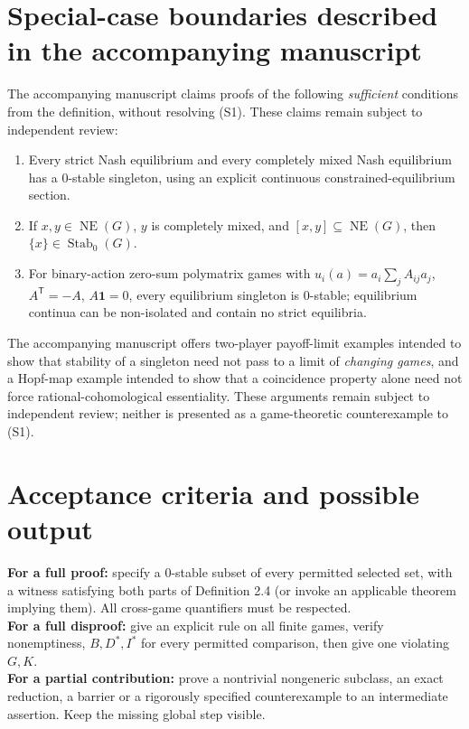 \documentclass[11pt]{article}
\newcommand{\NE}{\operatorname{NE}}
\newcommand{\Stab}{\operatorname{Stab}_0}
\begin{document}
\section*{Special-case boundaries described in the accompanying manuscript}
The accompanying manuscript claims proofs of the following \emph{sufficient}
conditions from the definition, without resolving (S1). These claims
remain subject to independent review:
\begin{enumerate}[leftmargin=2.0em]
\item Every strict Nash equilibrium and every completely mixed Nash
equilibrium has a $0$-stable singleton, using an explicit continuous
constrained-equilibrium section.
\item If $x,y\in\NE(G)$, $y$ is completely mixed, and
$[x,y]\subseteq\NE(G)$, then $\{x\}\in\Stab(G)$.
\item For binary-action zero-sum polymatrix games with
$u_i(a)=a_i\sum_jA_{ij}a_j$, $A^\mathsf T=-A$, $A\mathbf 1=0$,
every equilibrium singleton is $0$-stable; equilibrium continua can be
non-isolated and contain no strict equilibria.
\end{enumerate}
The accompanying manuscript offers two-player payoff-limit examples
intended to show that stability of a singleton need not pass to a limit of
\emph{changing games}, and a Hopf-map example intended to show that a
coincidence property alone need not force rational-cohomological essentiality.
These arguments remain subject to independent review; neither is presented
as a game-theoretic counterexample to (S1).

\section*{Acceptance criteria and possible output}
\noindent
\textbf{For a full proof:} specify a $0$-stable subset of every permitted
selected set, with a witness satisfying both parts of Definition 2.4
(or invoke an applicable theorem implying them). All cross-game
quantifiers must be respected.\\
\textbf{For a full disproof:} give an explicit rule on all finite games,
verify nonemptiness, $B,D^*,I^*$ for every permitted comparison, then
give one violating $G,K$.\\
\textbf{For a partial contribution:} prove a nontrivial nongeneric
subclass, an exact reduction, a barrier or a rigorously specified
counterexample to an intermediate assertion. Keep the missing global
step visible.
\end{document}

